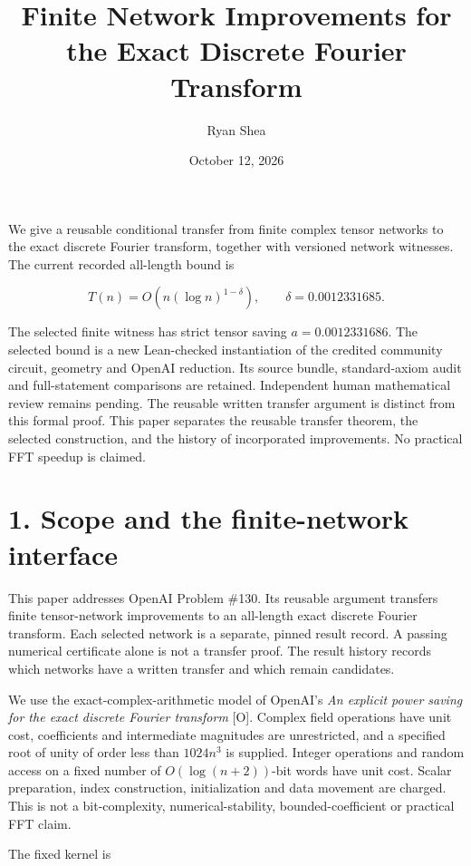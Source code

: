 \documentclass[
  11pt,
]{article}
\title{Finite Network Improvements for the Exact Discrete Fourier
Transform}
\author{Ryan Shea}
\date{October 12, 2026}
\begin{document}
\maketitle

We give a reusable conditional transfer from finite complex tensor
networks to the exact discrete Fourier transform, together with
versioned network witnesses. The current recorded all-length bound is

\[\boxed{T(n)=O\!\left(n(\log n)^{1-\delta}\right),\qquad
\delta=0.0012331685.}\]

The selected finite witness has strict tensor saving \(a=0.0012331686\).
The selected bound is a new Lean-checked instantiation of the credited
community circuit, geometry and OpenAI reduction. Its source bundle,
standard-axiom audit and full-statement comparisons are retained.
Independent human mathematical review remains pending. The reusable
written transfer argument is distinct from this formal proof. This paper
separates the reusable transfer theorem, the selected construction, and
the history of incorporated improvements. No practical FFT speedup is
claimed.

\section{1. Scope and the finite-network
interface}\label{scope-and-the-finite-network-interface}

This paper addresses OpenAI Problem \#130. Its reusable argument
transfers finite tensor-network improvements to an all-length exact
discrete Fourier transform. Each selected network is a separate, pinned
result record. A passing numerical certificate alone is not a transfer
proof. The result history records which networks have a written transfer
and which remain candidates.

We use the exact-complex-arithmetic model of OpenAI's \emph{An explicit
power saving for the exact discrete Fourier transform} {[}O{]}. Complex
field operations have unit cost, coefficients and intermediate
magnitudes are unrestricted, and a specified root of unity of order less
than \(1024n^3\) is supplied. Integer operations and random access on a
fixed number of \(O(\log(n+2))\)-bit words have unit cost. Scalar
preparation, index construction, initialization and data movement are
charged. This is not a bit-complexity, numerical-stability,
bounded-coefficient or practical FFT claim.

The fixed kernel is
\end{document}
